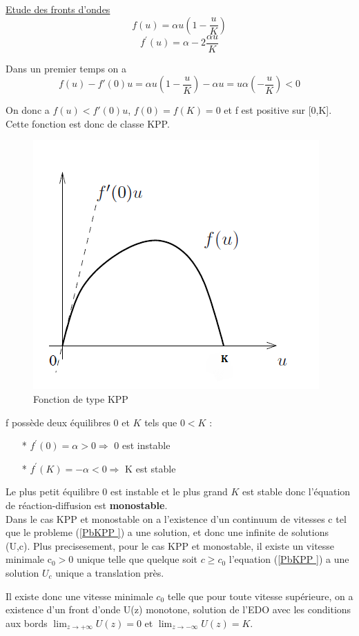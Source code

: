 \documentclass[a4paper,11pt]{article}
\begin{document}
\underline{Etude des fronts d'ondes}\\
$$f(u)= \alpha u (1 - \dfrac{u}{K})$$
$$f^\prime(u)= \alpha - 2 \frac{\alpha u}{K}$$


Dans un premier temps on a $$ f(u) - f'(0)u = \alpha u (1 - \dfrac{u}{K}) - \alpha u = u\alpha (- \dfrac{u}{K}) < 0$$

On donc a  $f(u) < f'(0)u$, $f(0) = f(K) = 0$ et f est positive sur [0,K]. Cette fonction est donc de classe KPP.

\begin{figure}[H]
	\centering
	\includegraphics[width=0.40\linewidth]{SimulationKPP/fu}\hfill
	\caption{Fonction de type KPP}
\end{figure}


f possède deux équilibres $0$ et $K$ tels que $0 < K$ :\\
	\begin{itemize}
    	\item[*] $f^\prime(0)= \alpha >0 \Rightarrow $ 0 est instable
        \item[*] $f^\prime(K)= -\alpha <0 \Rightarrow $ K est stable\\
	\end{itemize}
    
    
    Le plus petit équilibre $0$ est instable et le plus grand $K$ est stable donc l'équation de réaction-diffusion est \textbf{monostable}. \\

Dans le cas KPP et monostable on a l'existence d'un continuum de vitesses c tel que le probleme (\ref{PbKPP }) a une solution, et donc une infinite de solutions (U,c). Plus precisesement, pour le cas KPP et monostable, il existe un vitesse minimale c$_0 >0$ unique telle que quelque soit $c  \geqslant c_0$ l'equation (\ref{PbKPP }) a une solution $U_c$ unique a translation près.

    Il existe donc une vitesse minimale $c_0$ telle que pour toute vitesse supérieure, on a existence d'un front d'onde U(z) monotone, solution de l'EDO avec les conditions aux bords $\lim_{z \to +\infty} U(z)=0$ et $\lim_{z \to -\infty} U(z)=K$. \\
    
\end{document}
